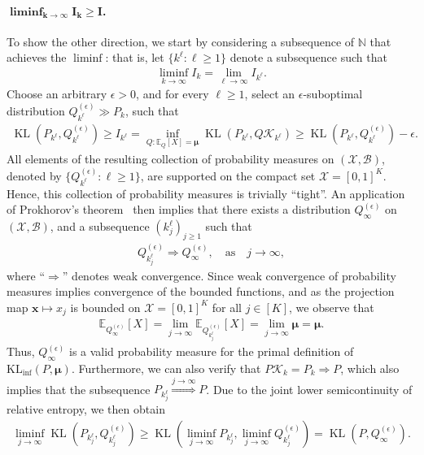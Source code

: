 \documentclass{article}
\theoremstyle{plain}
\theoremstyle{definition}
\newcommand{\lrp}[1]{\left( #1 \right)}
\newcommand{\KLinf}{\operatorname{KL_{inf}}}
\newcommand{\KL}{\operatorname{KL}}
\newcommand{\calX}{\mathcal X}
\newcommand{\calB}{\mathcal B}
\newcommand{\calK}{\mathcal{K}}
\newcommand{\xvec}{\mathbf{x}}
\newcommand{\qtext}[1]{\quad \text{#1} \quad}
\newcommand{\Qepsilon}{Q^{(\epsilon)}}
\newcommand{\boldmu}{\boldsymbol{\mu}}
\begin{document}
\paragraph{$\boldsymbol{\liminf_{k \to \infty} I_k \geq I}$.} To show the other direction, we start by considering a subsequence of $\mathbb{N}$ that achieves the $\liminf$: that is, let $\{k^\ell: \ell \geq 1\}$ denote a subsequence such that 
\begin{align}
    \liminf_{k \to \infty} I_k = \lim_{\ell \to \infty} I_{k^\ell}. 
\end{align}
Choose an arbitrary $\epsilon > 0$, and for every $\ell \geq 1$,  {select an $\epsilon$-suboptimal distribution $\Qepsilon_{k^\ell} \gg P_k$, such that} 
\begin{align}
 \KL(P_{k^\ell}, \Qepsilon_{k^\ell}) \geq    I_{k^\ell} = \inf_{Q: \mathbb{E}_{Q}[X]=\boldmu} \KL(P_{k^\ell},  Q \calK_{k^\ell} )  \geq \KL(P_{k^\ell}, \Qepsilon_{k^\ell}) - \epsilon. \label{eq:interchange-1-proof-2}
\end{align}
All elements of the resulting collection of probability measures on $(\calX, \calB)$, denoted by $\{\Qepsilon_{k^\ell}:\ell \geq 1\}$,  are supported on the compact set $\calX = [0,1]^K$. Hence, this collection of probability measures is trivially ``tight''. An application of  Prokhorov's theorem~\citep[Theorem 5.1]{billingsley1999convergence} then implies that there exists a distribution $\Qepsilon_\infty$ on $(\calX, \calB)$, and a subsequence $(k_j^\ell)_{j \geq 1}$ such that 
\begin{align}
    \Qepsilon_{k^{\ell}_j} \Longrightarrow \Qepsilon_\infty, \qtext{as} j \to \infty, 
\end{align}
where ``$\Longrightarrow$'' denotes weak convergence. 
{Since weak convergence of probability measures implies convergence of the bounded functions, and as the projection map $\xvec \mapsto x_j$ is bounded on $\calX = [0,1]^K$} for all $j \in [K]$, we observe that 
\begin{align}
\mathbb{E}_{\Qepsilon_\infty}[X] = \lim_{j \to \infty} \mathbb{E}_{\Qepsilon_{k_j^{\ell}}}[X] = \lim_{j \to \infty} \boldmu = \boldmu. \label{eq:interchange-1-proof-3}
\end{align}
Thus, $\Qepsilon_\infty$ is a valid probability measure for the primal definition of  $\KLinf(P, \boldmu)$. Furthermore, we can also verify that $ P\calK_k = P_k \Longrightarrow P$, which also implies that the subsequence $P_{k_j^\ell} \stackrel{j \to \infty}{\Longrightarrow} P$. Due to the joint lower semicontinuity of relative entropy, we then obtain 
\begin{align}
    \liminf_{j \to \infty} \KL(P_{k_j^\ell}, \Qepsilon_{k_j^\ell}) \geq \KL\lrp{\liminf_{j \to \infty} P_{k_j^\ell}, \liminf_{j \to \infty} \Qepsilon_{k_j^\ell}} = \KL(P, \Qepsilon_\infty). 
\end{align}
\end{document}
